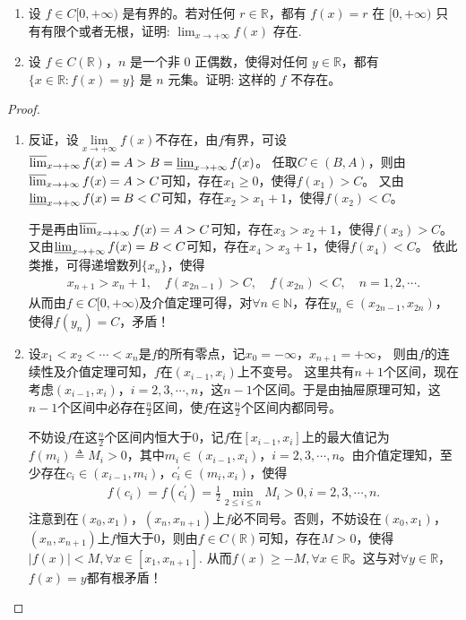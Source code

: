 \documentclass[../../main.tex]{subfiles}
\begin{document}
\begin{example}
\begin{enumerate}
\item 设 \(f\in C[0,+\infty)\) 是有界的。若对任何 \(r\in\mathbb{R}\)，都有 \(f(x)=r\) 在 \([0,+\infty)\) 只有有限个或者无根，证明:
$\lim_{x \to +\infty} f(x) \text{ 存在}.$

\item 设 \(f\in C(\mathbb{R})\)，\(n\) 是一个非 \(0\) 正偶数，使得对任何 \(y\in\mathbb{R}\)，都有 \(\{x\in\mathbb{R}:f(x)=y\}\) 是 \(n\) 元集。证明: 这样的 \(f\) 不存在。 
\end{enumerate}
\end{example}
\begin{proof}
\begin{enumerate}
\item 反证，设\(\lim\limits_{x \to +\infty} f(x)\)不存在，由\(f\)有界，可设\(\varlimsup_{x \to +\infty} f(x)=A > B=\varliminf_{x \to +\infty} f(x)\)。
任取\(C\in (B,A)\)，则由\(\varlimsup_{x \to +\infty} f(x)=A > C\)可知，存在\(x_1\geqslant 0\)，使得\(f(x_1)>C\)。
又由\(\varliminf_{x \to +\infty} f(x)=B < C\)可知，存在\(x_2 > x_1 + 1\)，使得\(f(x_2)<C\)。

于是再由\(\varlimsup_{x \to +\infty} f(x)=A > C\)可知，存在\(x_3 > x_2 + 1\)，使得\(f(x_3)>C\)。
又由\(\varliminf_{x \to +\infty} f(x)=B < C\)可知，存在\(x_4 > x_3 + 1\)，使得\(f(x_4)<C\)。
依此类推，可得递增数列\(\{x_n\}\)，使得
\begin{align*}
x_{n + 1} > x_n + 1, \quad f(x_{2n - 1}) > C, \quad f(x_{2n}) < C, \quad n = 1,2,\cdots.
\end{align*}
从而由\(f\in C[0,+\infty)\)及介值定理可得，对\(\forall n\in\mathbb{N}\)，存在\(y_n\in (x_{2n - 1},x_{2n})\)，使得\(f(y_n)=C\)，矛盾！ 

\item 设\(x_1<x_2<\cdots <x_n\)是\(f\)的所有零点，记\(x_0 = -\infty\)，\(x_{n + 1} = +\infty\)，
则由\(f\)的连续性及介值定理可知，\(f\)在\(( x_{i - 1},x_i )\)上不变号。
这里共有\(n + 1\)个区间，现在考虑\(( x_{i - 1},x_i )\)，\(i = 2,3,\cdots,n\)，这\(n - 1\)个区间。于是由抽屉原理可知，这\(n - 1\)个区间中必存在\(\frac{n}{2}\)区间，使\(f\)在这\(\frac{n}{2}\)个区间内都同号。

不妨设\(f\)在这\(\frac{n}{2}\)个区间内恒大于\(0\)，记\(f\)在\([ x_{i - 1},x_i ]\)上的最大值记为\(f( m_i ) \triangleq M_i>0\)，其中\(m_i\in ( x_{i - 1},x_i )\)，\(i = 2,3,\cdots,n\)。由介值定理知，至少存在\(c_i\in ( x_{i - 1},m_i )\)，\(c_{i}^{\prime}\in ( m_i,x_i )\)，使得
\begin{align*}
f( c_i ) =f( c_{i}^{\prime} ) =\frac{1}{2}\underset{2\leqslant  i\leqslant  n}{\min}M_i>0,i = 2,3,\cdots,n.
\end{align*}
注意到在\(( x_0,x_1 )\)，\(( x_n,x_{n + 1} )\)上\(f\)必不同号。否则，不妨设在\(( x_0,x_1 )\)，\(( x_n,x_{n + 1} )\)上\(f\)恒大于\(0\)，则由\(f\in C( \mathbb{R} )\)可知，存在\(M>0\)，使得
\(\left| f( x ) \right|<M,\forall x\in [ x_1,x_{n + 1} ].\)
从而\(f( x ) \geqslant -M,\forall x\in \mathbb{R} \)。这与对\(\forall y\in \mathbb{R} \)，\(f( x ) =y\)都有根矛盾！


\end{enumerate}
\end{proof}
\end{document}
